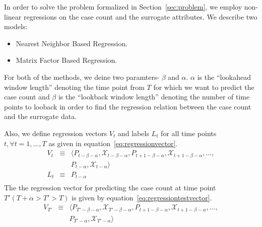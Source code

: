 
In order to solve the problem formalized in Section~\ref{sec:problem}, we employ
non-linear regressions on the case count and the surrogate attributes. 
We describe two models:
\begin{itemize}
  \item Nearest Neighbor Based Regression.
  \item Matrix Factor Based Regression.
\end{itemize}
For both of the methods, we deine two paramters- $\beta$ and $\alpha$. 
$\alpha$ is the ``lookahead window length'' denoting the time point from $T$ 
for which we want to predict the case count and $\beta$ 
is the ``lookback window length'' denoting the number of time points to looback
in order to find the regression relation between the case count and the surrogate 
data.

Also, we define regression vectors $V_t$  and 
labels $L_t$ for all time points $t, \forall t = 1,\dots, T$
as given in equation~\ref{eq:regressionvector}.
\begin{equation}
  \label{eq:regressionvector}
  \begin{array}{lcl}
    V_t & \equiv & \langle P_{t-\beta - \alpha}, \mathcal{X}_{t-\beta - \alpha}, P_{t + 1 -\beta-\alpha}, \mathcal{X}_{t + 1 - \beta-\alpha}, \dots, \\
        &        & P_{t-\alpha},\mathcal{X}_{t-\alpha} \rangle \\
    L_t & \equiv & P_{t - \alpha}\\
  \end{array}
\end{equation}
The the regression vector for predicting the case count at time point $T' (T +
\alpha > T' > T)$ is given by equation~\ref{eq:regressiontestvector}.
\begin{equation}
  \label{eq:regressiontestvector}
  \begin{array}{lcl}
    V_{T'} & \equiv & \langle P_{T'-\beta - \alpha}, \mathcal{X}_{T'-\beta - \alpha}, P_{t + 1 -\beta-\alpha}, \mathcal{X}_{t + 1 - \beta-\alpha}, \dots, \\
           &        & P_{T'-\alpha},\mathcal{X}_{T'-\alpha} \rangle \\
  \end{array}
\end{equation}


